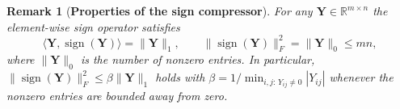 \documentclass{article}
\newtheorem{remark}{Remark}
\begin{document}

\begin{remark}[\textbf{Properties of the sign compressor}]\label{lem:sign}
For any $\mathbf{Y} \in \mathbb{R}^{m \times n}$ the element-wise sign operator satisfies
\begin{equation}
\langle \mathbf{Y}, \operatorname{sign}(\mathbf{Y}) \rangle = \|\mathbf{Y}\|_1,
\qquad
\|\operatorname{sign}(\mathbf{Y})\|_F^2 = \|\mathbf{Y}\|_0 \le mn,
\end{equation}
where $\|\mathbf{Y}\|_0$ is the number of nonzero entries. In particular,
$\|\operatorname{sign}(\mathbf{Y})\|_F^2 \le \beta \|\mathbf{Y}\|_1$ holds with
$\beta = 1/\min_{i,j:\,Y_{ij}\neq 0}|Y_{ij}|$ whenever the nonzero entries are bounded away from zero.
\end{remark}
\end{document}
